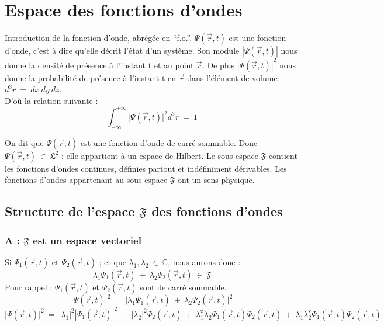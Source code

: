 \documentclass[12pt,a4paper,titlepage]{book}
\begin{document}
\section{Espace des fonctions d'ondes}
Introduction de la fonction d'onde, abrégée en \enquote{f.o.}. $\Psi (\overrightarrow{r}, t)$ est une fonction d'onde, c'est à dire qu'elle décrit l'état d'un système. Son module $|\Psi (\overrightarrow{r}, t) |$ nous donne la densité de présence à l'instant t et au point $\overrightarrow{r}$. De plus $|\Psi (\overrightarrow{r}, t)|^2$ nous donne la probabilité de présence à l'instant t en $\overrightarrow{r}$ dans l'élément de volume $d^3 r ~=~ dx~dy~dz$.\\

D'où la relation suivante :\\
\begin{equation*}
\int_{-\infty}^{+\infty} \vert \Psi (\overrightarrow{r}, t) \vert ^2 d^3 r ~=~ 1
\end{equation*}

On dit que $\Psi (\overrightarrow{r}, t)$ est une fonction d'onde de carré sommable. Donc $\Psi (\overrightarrow{r}, t) ~\in~ \mathfrak{L}^2$ : elle appartient à un espace de Hilbert. Le sous-espace $\mathfrak{F}$ contient les fonctions d'ondes continues, définies partout et indéfiniment dérivables. Les fonctions d'ondes appartenant au sous-espace $\mathfrak{F}$ ont un sens physique.

\subsection{Structure de l'espace $\mathfrak{F}$ des fonctions d'ondes}
\subsubsection{A : $\mathfrak{F}$ est un espace vectoriel}

Si $\Psi_1 (\overrightarrow{r}, t)$ et $\Psi_2 (\overrightarrow{r}, t)$ ; et que $\lambda_1, \lambda_2 ~\in~ \mathbb{C}$, nous aurons donc :
\begin{equation*}
\lambda_1 \Psi_1 (\overrightarrow{r}, t) ~+~ \lambda_2 \Psi_2 (\overrightarrow{r}, t) ~\in~ \mathfrak{F}
\end{equation*}
Pour rappel : $\Psi_1 (\overrightarrow{r}, t)$ et $\Psi_2 (\overrightarrow{r}, t)$ sont de carré sommable.\\
\begin{equation*}
\vert \Psi (\overrightarrow{r}, t) \vert^2 ~=~ \vert \lambda_1 \Psi_1 (\overrightarrow{r}, t) ~+~ \lambda_2 \Psi_2 (\overrightarrow{r}, t) \vert^2
\end{equation*}
\begin{equation*}
\vert \Psi (\overrightarrow{r}, t) \vert^2 ~=~ |\lambda_1 |^2 |\Psi_1 (\overrightarrow{r}, t)|^2 ~+~ |\lambda_2 |^2 \Psi_2 (\overrightarrow{r}, t) ~+~ \lambda_1^{\mathsf{x}} \lambda_2 \Psi_1 (\overrightarrow{r}, t) \Psi_2 (\overrightarrow{r}, t) ~+~ \lambda_1 \lambda_2^{\mathsf{x}} \Psi_1 (\overrightarrow{r}, t) \Psi_2 (\overrightarrow{r}, t)
\end{equation*}
\end{document}
